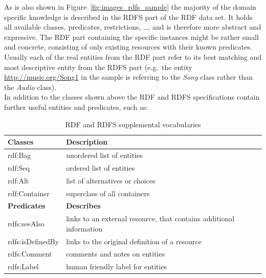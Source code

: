 
As is also shown in Figure~\ref{fig:images_rdfs_sample} the majority of the domain specific knowledge is described in the \gls{RDFS} part of the \gls{RDF} data set. It holds all available classes, predicates, restrictions, \ldots, and is therefore more abstract and expressive. The \gls{RDF} part containing the specific instances might be rather small and concrete, consisting of only existing resources with their known predicates. Usually each of the real entities from the \gls{RDF} part refer to its best matching and most descriptive entity from the \gls{RDFS} part (e.g.\ the entity \url{http://music.org/Song1} in the sample is referring to the \emph{Song} class rather than the \emph{Audio} class). \\

In addition to the classes shown above the \gls{RDF} and \gls{RDFS} specifications contain further useful entities and predicates, such as: \@

\begin{table}[H]
\centering
\begin{tabular}{p{4cm}p{7cm}}
\hline
\textbf{Classes} & \textbf{Description} \\
\hline
rdf:Bag & unordered list of entities \\
\hline
rdf:Seq & ordered list of entities \\
\hline
rdf:Alt & list of alternatives or choices \\
\hline
rdf:Container & superclass of all containers \\
\hline
\textbf{Predicates} & \textbf{Describes} \\
\hline
rdfs:seeAlso &	links to an external resource, that contains additional information \\
\hline
rdfs:isDefinedBy & links to the original definition of a resource \\
\hline
rdfs:Comment & comments and notes on entities \\
\hline
rdfs:Label & human friendly label for entities \\
\hline
\end{tabular}
\caption[\gls{RDF} and \gls{RDFS} supplemental vocabularies]{\gls{RDF} and \gls{RDFS} supplemental vocabularies \citep[pg. 89-90]{antoniou2008semantic}}
\label{tab:w3c_vocab_supplement}
\end{table}

